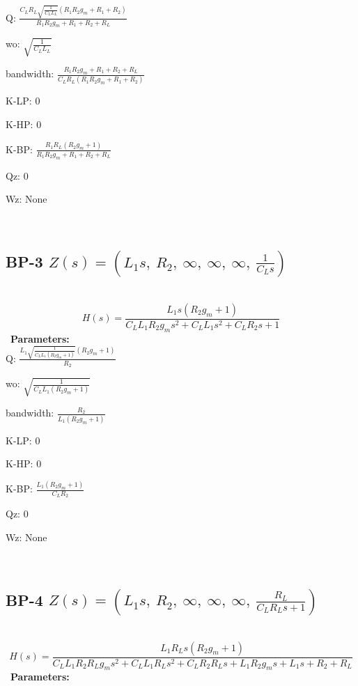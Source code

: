 \documentclass{article}
\begin{document}
Q: $\frac{C_{L} R_{L} \sqrt{\frac{1}{C_{L} L_{L}}} \left(R_{1} R_{2} g_{m} + R_{1} + R_{2}\right)}{R_{1} R_{2} g_{m} + R_{1} + R_{2} + R_{L}}$\ 

wo: $\sqrt{\frac{1}{C_{L} L_{L}}}$\ 

bandwidth: $\frac{R_{1} R_{2} g_{m} + R_{1} + R_{2} + R_{L}}{C_{L} R_{L} \left(R_{1} R_{2} g_{m} + R_{1} + R_{2}\right)}$\ 

K-LP: $0$\ 

K-HP: $0$\ 

K-BP: $\frac{R_{1} R_{L} \left(R_{2} g_{m} + 1\right)}{R_{1} R_{2} g_{m} + R_{1} + R_{2} + R_{L}}$\ 

Qz: $0$\ 

Wz: $\text{None}$\ 

\ 

\subsection{BP-3 $Z(s) = \left( L_{1} s, \  R_{2}, \  \infty, \  \infty, \  \infty, \  \frac{1}{C_{L} s}\right)$ } \ 
\textbf{\[H(s) = \frac{L_{1} s \left(R_{2} g_{m} + 1\right)}{C_{L} L_{1} R_{2} g_{m} s^{2} + C_{L} L_{1} s^{2} + C_{L} R_{2} s + 1}\] } \ 
\textbf{Parameters:}\\ 

Q: $\frac{L_{1} \sqrt{\frac{1}{C_{L} L_{1} \left(R_{2} g_{m} + 1\right)}} \left(R_{2} g_{m} + 1\right)}{R_{2}}$\ 

wo: $\sqrt{\frac{1}{C_{L} L_{1} \left(R_{2} g_{m} + 1\right)}}$\ 

bandwidth: $\frac{R_{2}}{L_{1} \left(R_{2} g_{m} + 1\right)}$\ 

K-LP: $0$\ 

K-HP: $0$\ 

K-BP: $\frac{L_{1} \left(R_{2} g_{m} + 1\right)}{C_{L} R_{2}}$\ 

Qz: $0$\ 

Wz: $\text{None}$\ 

\ 

\subsection{BP-4 $Z(s) = \left( L_{1} s, \  R_{2}, \  \infty, \  \infty, \  \infty, \  \frac{R_{L}}{C_{L} R_{L} s + 1}\right)$ } \ 
\textbf{\[H(s) = \frac{L_{1} R_{L} s \left(R_{2} g_{m} + 1\right)}{C_{L} L_{1} R_{2} R_{L} g_{m} s^{2} + C_{L} L_{1} R_{L} s^{2} + C_{L} R_{2} R_{L} s + L_{1} R_{2} g_{m} s + L_{1} s + R_{2} + R_{L}}\] } \ 
\textbf{Parameters:}\\ 
\end{document}
